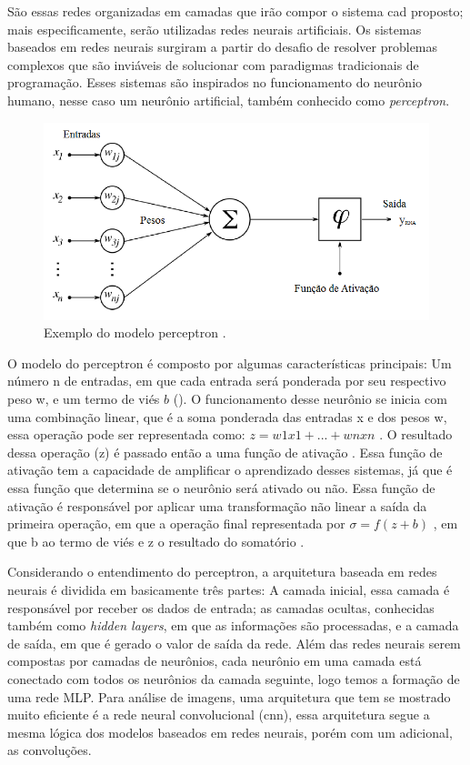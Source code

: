 São essas redes organizadas em camadas que irão compor o sistema \gls{cad} proposto; mais especificamente, serão utilizadas redes neurais artificiais. Os sistemas baseados em redes neurais surgiram a partir do desafio de resolver problemas complexos que são inviáveis de solucionar com paradigmas tradicionais de programação. Esses sistemas são inspirados no funcionamento do neurônio humano, nesse caso um neurônio artificial, também conhecido como \textit{perceptron}.

\begin{figure}[h]
\centering\includegraphics[scale=0.4]{images/Figura-1-neuronio-artificial.png}
\caption{Exemplo do modelo perceptron \cite{imagemperceptron}.}
\label{fig: perceptron}
\end{figure}

O modelo do perceptron é composto por algumas características principais: Um número n de entradas, em que cada entrada será ponderada por seu respectivo peso w, e um termo de viés \(b\) (). O funcionamento desse neurônio se inicia com uma combinação linear, que é a soma ponderada das entradas x e dos pesos w, essa operação pode ser representada como: \(z = w1  x1 + ... + wn  xn\)  . O resultado dessa operação (z) é passado então a uma função de ativação . Essa função de ativação tem a capacidade de amplificar o aprendizado desses sistemas, já que é essa função que determina se o neurônio será ativado ou não. Essa função de ativação é responsável por aplicar uma transformação não linear a saída da primeira operação, em que a operação final representada por \(  \sigma  = f(z + b)\) , em que b ao termo de viés e z o resultado do somatório \cite{haykin2009neural}. 


Considerando o entendimento do perceptron, a arquitetura baseada em redes neurais é dividida em basicamente três partes: A camada inicial, essa camada é responsável por receber os dados de entrada; as camadas ocultas, conhecidas também como \textit{hidden layers}, em que as informações são processadas, e a camada de saída, em que é gerado o valor de saída da rede. Além das redes neurais serem compostas por camadas de neurônios, cada neurônio em uma camada está conectado com todos os neurônios da camada seguinte, logo temos a formação de uma rede \ac{MLP}. Para análise de imagens, uma arquitetura que tem se mostrado muito eficiente é a rede neural convolucional (\gls{cnn}), essa arquitetura segue a mesma lógica dos modelos baseados em redes neurais, porém com um adicional, as convoluções. 


